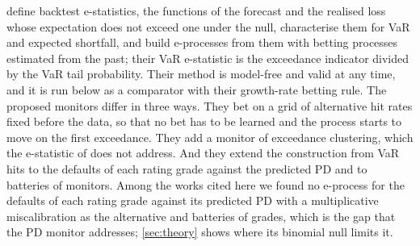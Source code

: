 \citet{wang2022} define backtest e-statistics, the functions of the forecast and the realised loss whose expectation does not exceed one under the null, characterise them for
VaR and expected shortfall, and build e-processes from them with betting processes estimated from the past; their VaR e-statistic is the exceedance indicator divided by the VaR
tail probability. Their method is model-free and valid at any time, and it is run below as a comparator with their growth-rate betting rule. The proposed monitors differ in three
ways. They bet on a grid of alternative hit rates fixed before the data, so that no bet has to be learned and the process starts to move on the first exceedance. They add a monitor of
exceedance clustering, which the e-statistic of \citet{wang2022} does not address. And they extend the construction from VaR hits to the defaults of each rating grade against the predicted PD and to batteries of
monitors. Among the works cited here we found no e-process for the defaults of each rating grade against its predicted PD with a multiplicative miscalibration as the alternative and batteries of grades, which is the gap that the PD monitor addresses; \cref{sec:theory}
shows where its binomial null limits it.
